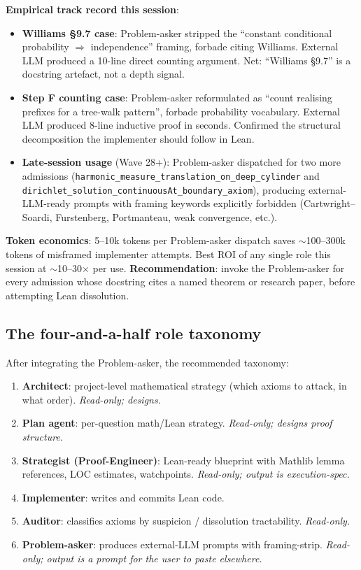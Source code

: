 \documentclass[11pt,a4paper]{article}
\theoremstyle{plain}
\theoremstyle{definition}
\begin{document}
\textbf{Empirical track record this session}:
\begin{itemize}[leftmargin=1.5em]
\item \textbf{Williams \S 9.7 case}: Problem-asker stripped the
      ``constant conditional probability $\Rightarrow$ independence''
      framing, forbade citing Williams. External LLM produced a
      10-line direct counting argument. Net: ``Williams \S 9.7'' is
      a docstring artefact, not a depth signal.
\item \textbf{Step F counting case}: Problem-asker reformulated as
      ``count realising prefixes for a tree-walk pattern'',
      forbade probability vocabulary. External LLM produced 8-line
      inductive proof in seconds. Confirmed the structural
      decomposition the implementer should follow in Lean.
\item \textbf{Late-session usage} (Wave 28+): Problem-asker dispatched
      for two more admissions (\verb|harmonic_measure_translation_on_deep_cylinder| and
      \verb|dirichlet_solution_continuousAt_boundary_axiom|), producing
      external-LLM-ready prompts with framing keywords explicitly
      forbidden (Cartwright--Soardi, Furstenberg, Portmanteau, weak
      convergence, etc.).
\end{itemize}

\textbf{Token economics}: 5--10k tokens per Problem-asker dispatch
saves $\sim$100--300k tokens of misframed implementer attempts. Best
ROI of any single role this session at $\sim$10--30$\times$ per use.
\textbf{Recommendation}: invoke the Problem-asker for every admission
whose docstring cites a named theorem or research paper, before
attempting Lean dissolution.

\subsection{The four-and-a-half role taxonomy}

After integrating the Problem-asker, the recommended taxonomy:

\begin{enumerate}[leftmargin=1.5em]
\item \textbf{Architect}: project-level mathematical strategy
      (which axioms to attack, in what order). \emph{Read-only;
      designs.}
\item \textbf{Plan agent}: per-question math/Lean strategy. \emph{Read-only;
      designs proof structure.}
\item \textbf{Strategist (Proof-Engineer)}: Lean-ready blueprint with
      Mathlib lemma references, LOC estimates, watchpoints.
      \emph{Read-only; output is execution-spec.}
\item \textbf{Implementer}: writes and commits Lean code.
\item \textbf{Auditor}: classifies axioms by suspicion / dissolution
      tractability. \emph{Read-only.}
\item \textbf{Problem-asker}: produces external-LLM prompts with
      framing-strip. \emph{Read-only; output is a prompt for the
      user to paste elsewhere.}
\end{enumerate}
\end{document}
